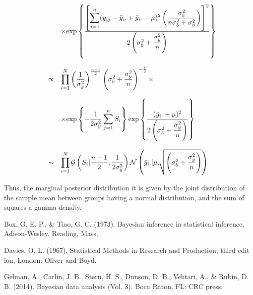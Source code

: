 \documentclass{asaproc}
\begin{document}
\begin{small}
\begin{eqnarray*}
\begin{array}{lcl ll }
&  & \times \mbox{exp}\left\{ \dfrac{\left[\displaystyle\sum_{j=1}^{n}(y_{ij} - \bar{y}_{i\cdot} + \bar{y}_{i\cdot}-\mu)^2  \left(\dfrac{\sigma_b^2}{n\sigma_b^2 + \sigma_y^2}\right) \right]^2 }{2\left(\sigma_b^2 + \dfrac{\sigma_y^2}{n}\right)}\right\}\\\\


& \propto & \displaystyle\prod_{i=1}^{N}\left(\dfrac{1}{\sigma_y^2}\right)^{\frac{n-1}{2}} 

\left(\sigma_b^2 + \dfrac{\sigma_y^2}{n}\right)^{-\frac{1}{2}}  \times \\ \\

& & \times \mbox{exp}\left\{ -\dfrac{1}{2\sigma_y^2}\displaystyle\sum_{j=1}^{n}S_i\right\} \mbox{exp}\left\{ \dfrac{(\bar{y}_{i\cdot}-\mu)^2 }{2\left(\sigma_b^2 + \dfrac{\sigma_y^2}{n}\right)}\right\}\\\\

& \sim & \displaystyle\prod_{i=1}^{N} \mathcal{G} \left(S_i | \dfrac{n-1}{2}, \dfrac{1}{2\sigma_y^2} \right) \mathcal{N}  \left(\bar{y}_{i\cdot} | \mu, \sqrt[]{\left(\sigma_b^2 + \dfrac{\sigma_y^2}{n}\right)} \right)\\

\end{array}
\end{eqnarray*}
\end{small}

Thus, the marginal posterior distribution it is given by the joint distribution of the sample mean between groups having a normal distribution, and the sum of squares a gamma density.

\begin{references}
{\footnotesize
\itemsep=3pt

\item Box, G. E. P., \& Tiao, G. C. (1973). Bayesian inference in statistical inference. Adison-Wesley, Reading, Mass.

\item Davies, O. L. (1967), Statistical Methods in Research and Production, third edit ion,
London: Oliver and Boyd.

\item Gelman, A., Carlin, J. B., Stern, H. S., Dunson, D. B., Vehtari, A., \& Rubin, D. B. (2014). Bayesian data analysis (Vol. 3). Boca Raton, FL: CRC press.
}

\end{references}
\end{document}
